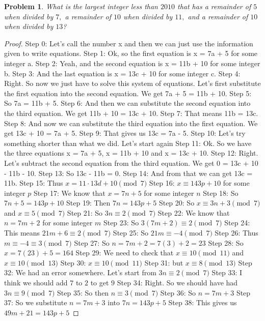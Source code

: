 \documentclass{article}
\newtheorem{theorem}{Problem}
\begin{document}
\begin{theorem}
What is the largest integer less than $2010$ that has a remainder of $5$ when divided by $7,$ a remainder of $10$ when divided by $11,$ and a remainder of $10$ when divided by $13$?
\end{theorem}

\begin{proof}
Step 0: Let's call the number x and then we can just use the information given to write equations.
Step 1: Ok, so the first equation is x = 7a + 5 for some integer a.
Step 2: Yeah, and the second equation is x = 11b + 10 for some integer b.
Step 3: And the last equation is x = 13c + 10 for some integer c.
Step 4: Right. So now we just have to solve this system of equations. Let's first substitute the first equation into the second equation. We get 7a + 5 = 11b + 10.
Step 5: So 7a = 11b + 5.
Step 6: And then we can substitute the second equation into the third equation. We get 11b + 10 = 13c + 10.
Step 7: That means 11b = 13c.
Step 8: And now we can substitute the third equation into the first equation. We get 13c + 10 = 7a + 5.
Step 9: That gives us 13c = 7a - 5.
Step 10: Let's try something shorter than what we did. Let's start again
Step 11: Ok. So we have the three equations x = 7a + 5, x = 11b + 10 and x = 13c + 10.
Step 12: Right. Let's subtract the second equation from the third equation. We get 0 = 13c + 10 - 11b - 10.
Step 13: So 13c - 11b = 0.
Step 14: And from that we can get 13c = 11b.
Step 15: Thus $x = 11\cdot 13 d + 10 \pmod{7}$
Step 16: $x \equiv 143p + 10$ for some integer $p$
Step 17: We know that $x = 7n + 5$ for some integer $n$
Step 18: So $7n + 5 = 143p + 10$
Step 19: Then $7n = 143p + 5$
Step 20: So $x \equiv 3n + 3 \pmod{7}$ and $x \equiv 5 \pmod 7$
Step 21: So $3n \equiv 2 \pmod{7}$
Step 22: We know that $n = 7m + 2$ for some integer $m$
Step 23: So $3(7m + 2) \equiv 2 \pmod{7}$
Step 24: This means $21m + 6 \equiv 2 \pmod{7}$
Step 25: So $21m \equiv -4 \pmod 7$
Step 26: Thus $m \equiv -4 \equiv 3 \pmod 7$
Step 27: So $n = 7m + 2 = 7(3) + 2 = 23$
Step 28: So $x = 7(23) + 5 = 164$
Step 29: We need to check that $x \equiv 10 \pmod{11}$ and $x \equiv 10 \pmod{13}$
Step 30: $x \equiv 10 \pmod{11}$
Step 31: but $x \equiv 8 \pmod{13}$
Step 32: We had an error somewhere. Let's start from $3n \equiv 2 \pmod 7$
Step 33: I think we should add $7$ to $2$ to get $9$
Step 34: Right. So we should have had $3n \equiv 9 \pmod 7$
Step 35: So then $n \equiv 3 \pmod 7$
Step 36: So $n = 7m + 3$
Step 37: So we substitute $n = 7m +3$ into $7n = 143p + 5$
Step 38: This gives us $49m + 21 = 143p + 5$

\end{proof}
\end{document}
